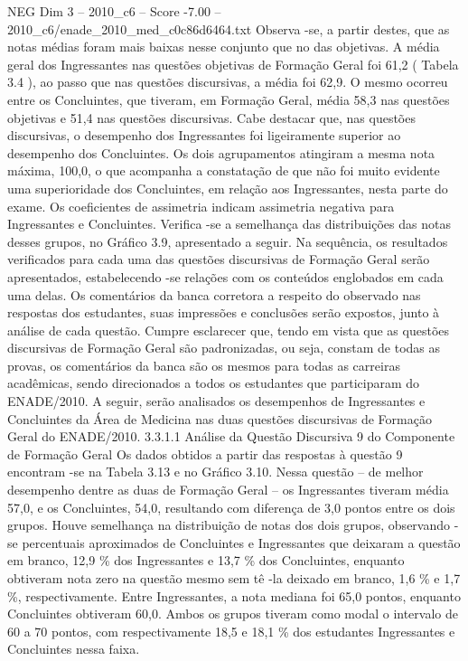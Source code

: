 \begin{textsample}{NEG Dim 3 – 2010\_c6 – Score -7.00 – 2010\_c6/enade\_2010\_med\_c0c86d6464.txt}
Observa -se, a partir destes, que as notas médias foram mais baixas nesse conjunto que no das objetivas.
A média geral dos Ingressantes nas questões objetivas de Formação Geral foi 61,2 ( Tabela 3.4 ), ao passo que nas questões discursivas, a média foi 62,9.
O mesmo ocorreu entre os Concluintes, que tiveram, em Formação Geral, média 58,3 nas questões objetivas e 51,4 nas questões discursivas.
Cabe destacar que, nas questões discursivas, o desempenho dos Ingressantes foi ligeiramente superior ao desempenho dos Concluintes.
Os dois agrupamentos atingiram a mesma nota máxima, 100,0, o que acompanha a constatação de que não foi muito evidente uma superioridade dos Concluintes, em relação aos Ingressantes, nesta parte do exame.
Os coeficientes de assimetria indicam assimetria negativa para Ingressantes e Concluintes.
Verifica -se a semelhança das distribuições das notas desses grupos, no Gráfico 3.9, apresentado a seguir.
Na sequência, os resultados verificados para cada uma das questões discursivas de Formação Geral serão apresentados, estabelecendo -se relações com os conteúdos englobados em cada uma delas.
Os comentários da banca corretora a respeito do observado nas respostas dos estudantes, suas impressões e conclusões serão expostos, junto à análise de cada questão.
Cumpre esclarecer que, tendo em vista que as questões discursivas de Formação Geral são padronizadas, ou seja, constam de todas as provas, os comentários da banca são os mesmos para todas as carreiras acadêmicas, sendo direcionados a todos os estudantes que participaram do ENADE/2010.
A seguir, serão analisados os desempenhos de Ingressantes e Concluintes da Área de Medicina nas duas questões discursivas de Formação Geral do ENADE/2010. 3.3.1.1 Análise da Questão Discursiva 9 do Componente de Formação Geral Os dados obtidos a partir das respostas à questão 9 encontram -se na Tabela 3.13 e no Gráfico 3.10.
Nessa questão – de melhor desempenho dentre as duas de Formação Geral – os Ingressantes tiveram média 57,0, e os Concluintes, 54,0, resultando com diferença de 3,0 pontos entre os dois grupos.
Houve semelhança na distribuição de notas dos dois grupos, observando -se percentuais aproximados de Concluintes e Ingressantes que deixaram a questão em branco, 12,9 \% dos Ingressantes e 13,7 \% dos Concluintes, enquanto obtiveram nota zero na questão mesmo sem tê -la deixado em branco, 1,6 \% e 1,7 \%, respectivamente.
Entre Ingressantes, a nota mediana foi 65,0 pontos, enquanto Concluintes obtiveram 60,0.
Ambos os grupos tiveram como modal o intervalo de 60 a 70 pontos, com respectivamente 18,5 e 18,1 \% dos estudantes Ingressantes e Concluintes nessa faixa.

\end{textsample}

